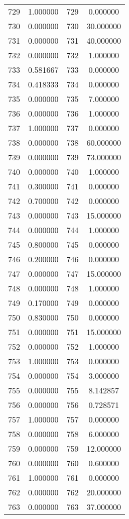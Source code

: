 \documentclass[12pt]{article}
\begin{document}
\begin{longtable}{@{}cccc@{}}
729 & 1.000000 & 729 & 0.000000 \\
730 & 0.000000 & 730 & 30.000000 \\
731 & 0.000000 & 731 & 40.000000 \\
732 & 0.000000 & 732 & 1.000000 \\
733 & 0.581667 & 733 & 0.000000 \\
734 & 0.418333 & 734 & 0.000000 \\
735 & 0.000000 & 735 & 7.000000 \\
736 & 0.000000 & 736 & 1.000000 \\
737 & 1.000000 & 737 & 0.000000 \\
738 & 0.000000 & 738 & 60.000000 \\
739 & 0.000000 & 739 & 73.000000 \\
740 & 0.000000 & 740 & 1.000000 \\
741 & 0.300000 & 741 & 0.000000 \\
742 & 0.700000 & 742 & 0.000000 \\
743 & 0.000000 & 743 & 15.000000 \\
744 & 0.000000 & 744 & 1.000000 \\
745 & 0.800000 & 745 & 0.000000 \\
746 & 0.200000 & 746 & 0.000000 \\
747 & 0.000000 & 747 & 15.000000 \\
748 & 0.000000 & 748 & 1.000000 \\
749 & 0.170000 & 749 & 0.000000 \\
750 & 0.830000 & 750 & 0.000000 \\
751 & 0.000000 & 751 & 15.000000 \\
752 & 0.000000 & 752 & 1.000000 \\
753 & 1.000000 & 753 & 0.000000 \\
754 & 0.000000 & 754 & 3.000000 \\
755 & 0.000000 & 755 & 8.142857 \\
756 & 0.000000 & 756 & 0.728571 \\
757 & 1.000000 & 757 & 0.000000 \\
758 & 0.000000 & 758 & 6.000000 \\
759 & 0.000000 & 759 & 12.000000 \\
760 & 0.000000 & 760 & 0.600000 \\
761 & 1.000000 & 761 & 0.000000 \\
762 & 0.000000 & 762 & 20.000000 \\
763 & 0.000000 & 763 & 37.000000 \\

\end{longtable}
\end{document}
